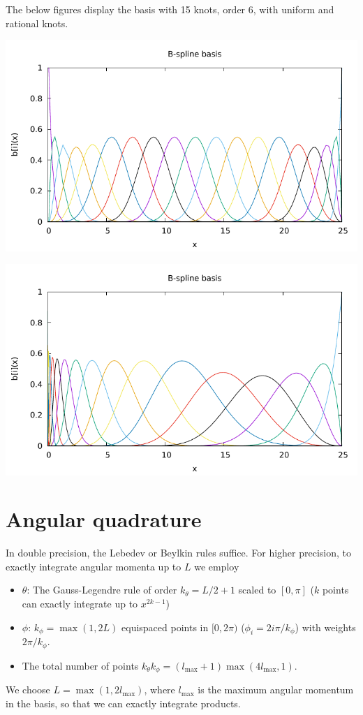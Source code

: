 \documentclass[12pt]{article}
\begin{document}
The below figures display the basis with 15 knots, order 6, with uniform and rational knots.

\includegraphics[width=.9\linewidth]{basis.pdf}

\includegraphics[width=.9\linewidth]{basis-non-uni.pdf}

\section{Angular quadrature}
In double precision, the Lebedev or Beylkin rules suffice.  For higher precision, to exactly integrate angular momenta up to $L$  we employ
\begin{itemize}
\item $\theta$: The Gauss-Legendre rule of order $k_\theta = L/2 + 1$ scaled to $[0,\pi]$ ($k$ points can exactly integrate up to $x^{2k-1}$)
\item $\phi$: $k_\phi = \max(1,2 L)$ equispaced points in $[0,2 \pi)$ ($\phi_i = 2 i \pi / k_\phi$) with weights $2 \pi / k_\phi$.
 \item The total number of points $k_\theta k_\phi = (l_{\mbox{max}} + 1) \max(4 l_{\mbox{max}},1) $.
\end{itemize}
We choose $L = \max(1, 2 l_{\mbox{max}})$, where $l_{\mbox{max}}$ is the maximum angular momentum in the basis, so that we can exactly integrate products.
\end{document}
